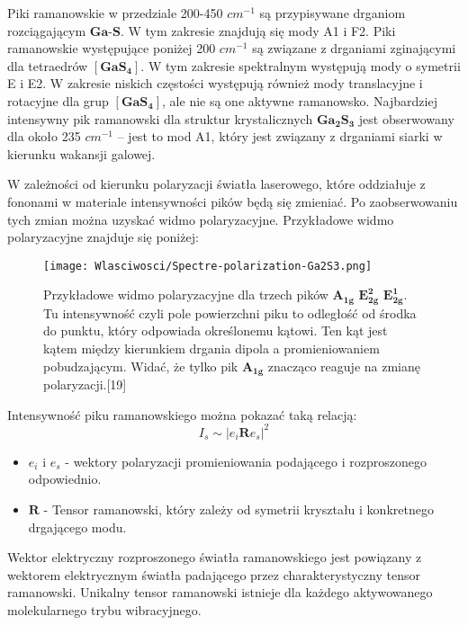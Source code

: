 Piki ramanowskie w przedziale 200-450 $cm^{-1}$ są przypisywane drganiom rozciągającym $\mathbf{Ga}$-$\mathbf{S}$. W tym zakresie znajdują się mody A1 i F2. Piki ramanowskie występujące poniżej 200 $cm^{-1}$ są związane z drganiami zginającymi dla tetraedrów $[\mathbf{GaS_{4}}]$. 
W tym zakresie spektralnym występują mody o symetrii E i E2. W zakresie niskich częstości występują również mody translacyjne i rotacyjne dla grup $[\mathbf{GaS_{4}}]$, ale nie są one aktywne ramanowsko. Najbardziej intensywny pik ramanowski dla struktur krystalicznych $\mathbf{Ga_{2}S_{3}}$ jest obserwowany dla około 235 $cm^{-1}$ – jest to mod A1, który jest związany z drganiami siarki w kierunku wakansji galowej. 


W zależności od kierunku polaryzacji światła laserowego, które oddziałuje z fononami w materiale intensywności pików będą się zmieniać. Po zaobserwowaniu tych zmian można uzyskać widmo polaryzacyjne. Przykładowe widmo polaryzacyjne znajduje się poniżej:
 
\begin{figure}[H]
	\begin{center}
		\texttt{[image: Wlasciwosci/Spectre-polarization-Ga2S3.png]}
		\caption{Przykładowe widmo polaryzacyjne dla trzech pików $\mathbf{A_{1g}}$ $\mathbf{E_{2g}^{2}}$ $\mathbf{E_{2g}^{1}}$. Tu intensywność czyli pole powierzchni piku to odległość od środka do punktu, który odpowiada określonemu kątowi. Ten kąt jest kątem między kierunkiem drgania dipola a promieniowaniem pobudzającym. Widać, że tylko pik $\mathbf{A_{1g}}$ znacząco reaguje na zmianę polaryzacji.[19]}
	\end{center}
\end{figure}

Intensywność piku ramanowskiego można pokazać taką relacją:
\begin{equation}
	I_{s} \sim |e_{i}\mathbf{R}e_{s}|^{2}
\end{equation}
\begin{itemize}
	\item $e_{i}$ i $e_{s}$ - wektory polaryzacji promieniowania podającego i rozproszonego odpowiednio.
	\item $\mathbf{R}$ - Tensor ramanowski, który zależy od symetrii kryształu i konkretnego drgającego modu.
\end{itemize}

Wektor elektryczny rozproszonego światła ramanowskiego jest powiązany z wektorem elektrycznym światła padającego przez charakterystyczny tensor ramanowski. Unikalny tensor ramanowski istnieje dla każdego aktywowanego molekularnego trybu wibracyjnego.

